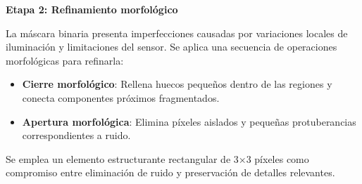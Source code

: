 \textbf{Etapa 2: Refinamiento morfológico}

La máscara binaria presenta imperfecciones causadas por variaciones locales de iluminación y limitaciones del sensor. Se aplica una secuencia de operaciones morfológicas para refinarla:

\begin{itemize}[label=$\bullet$]
    \item \textbf{Cierre morfológico}: Rellena huecos pequeños dentro de las regiones y conecta componentes próximos fragmentados.
    \item \textbf{Apertura morfológica}: Elimina píxeles aislados y pequeñas protuberancias correspondientes a ruido.
\end{itemize}

Se emplea un elemento estructurante rectangular de 3×3 píxeles como compromiso entre eliminación de ruido y preservación de detalles relevantes.

